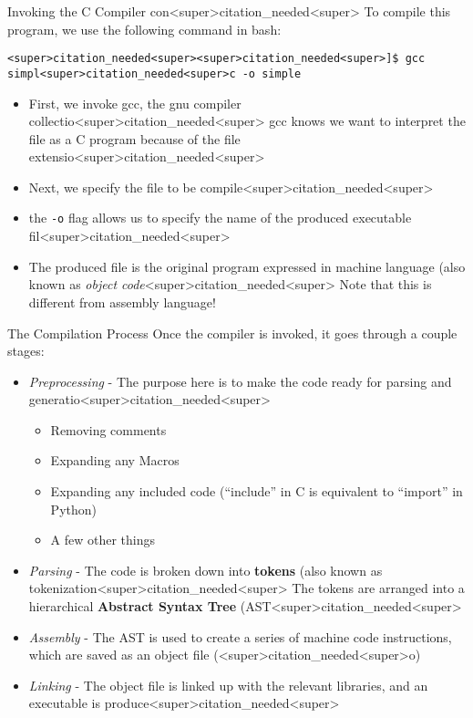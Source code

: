 \documentclass[11pt]{beamer}
\begin{document}
\begin{frame}[fragile=singleslide]{Invoking the C Compiler con<super>citation_needed<super>}
To compile this program, we use the following command in bash:
\begin{verbatim}
<super>citation_needed<super><super>citation_needed<super>]$ gcc simpl<super>citation_needed<super>c -o simple
\end{verbatim}
\begin{itemize}
\item First, we invoke gcc, the gnu compiler collectio<super>citation_needed<super>  gcc knows we want to interpret the file as a C program because of the file extensio<super>citation_needed<super>
\item Next, we specify the file to be compile<super>citation_needed<super>  
\item the \texttt{-o} flag allows us to specify the name of the produced executable fil<super>citation_needed<super>  
\item The produced file is the original program expressed in machine language (also known as \textit{object code}<super>citation_needed<super>  Note that this is different from assembly language!  
\end{itemize}
\end{frame}

\begin{frame}{The Compilation Process}
Once the compiler is invoked, it goes through a couple stages:
\begin{itemize}
\item \textit{Preprocessing} - The purpose here is to make the code ready for parsing and generatio<super>citation_needed<super>
\begin{itemize}
\item Removing comments
\item Expanding any Macros
\item Expanding any included code (``include'' in C is equivalent to ``import'' in Python) 
\item A few other things
\end{itemize} 
\item \textit{Parsing} - The code is broken down into \textbf{tokens} (also known as tokenization<super>citation_needed<super>  The tokens are arranged into a hierarchical \textbf{Abstract Syntax Tree} (AST<super>citation_needed<super>
\item \textit{Assembly} - The AST is used to create a series of machine code instructions, which are saved as an object file (<super>citation_needed<super>o)
\item \textit{Linking} - The object file is linked up with the relevant libraries, and an executable is produce<super>citation_needed<super>  
\end{itemize}
\end{frame}
\end{document}
